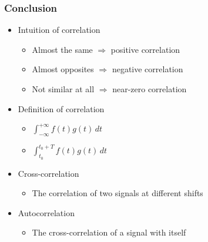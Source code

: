 \documentclass[aspectratio=169]{beamer}
\begin{document}
\begin{frame}
  \frametitle{Conclusion}

  \begin{itemize}
    \item<2-> Intuition of correlation
    
      \begin{itemize}
        \item Almost the same $\Rightarrow$ positive correlation
        
        \item Almost opposites $\Rightarrow$ negative correlation
        
        \item Not similar at all $\Rightarrow$ near-zero correlation
      \end{itemize}
        
    \item<3-> Definition of correlation
    
      \begin{itemize}
        \item $\int_{-\infty}^{+\infty} f(t) g(t) \,dt$
        
        \item $\int_{t_0}^{t_0 + T} f(t) g(t) \,dt$
      \end{itemize}
    
    \item<4-> Cross-correlation
    
      \begin{itemize}
        \item The correlation of two signals at different shifts
      \end{itemize}
    
    \item<5-> Autocorrelation
    
      \begin{itemize}
        \item The cross-correlation of a signal with itself
      \end{itemize}
  \end{itemize}
\end{frame}
\end{document}
